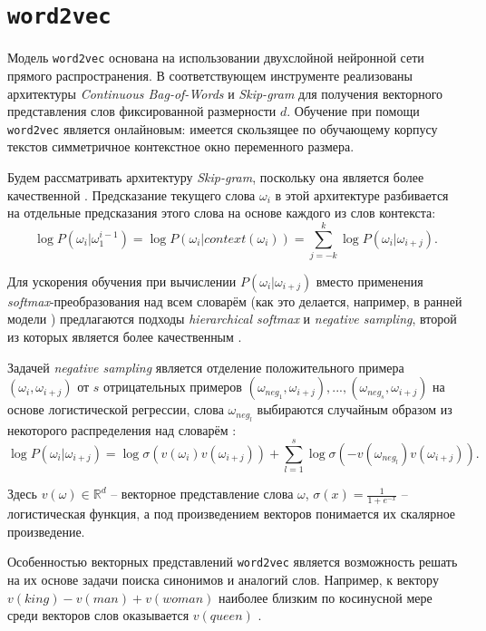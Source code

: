 \section{\texttt{word2vec}}
\label{sec:Chapter2} 

Модель \texttt{word2vec} основана на использовании двухслойной нейронной сети прямого распространения. В соответствующем инструменте реализованы архитектуры \textit{Continuous Bag-of-Words} и \textit{Skip-gram} \cite{mikolov1} для получения векторного представления слов фиксированной размерности \(d\). Обучение при помощи \texttt{word2vec} является онлайновым: имеется скользящее по обучающему корпусу текстов симметричное контекстное окно переменного размера.

Будем рассматривать архитектуру \textit{Skip-gram}, поскольку она является более качественной \cite{mikolov1}. Предсказание текущего слова \(\omega_i\) в этой архитектуре разбивается на отдельные предсказания этого слова на основе каждого из слов контекста: \[\log P(\omega_i|\omega_1^{i-1}) = \log P(\omega_i|context(\omega_i)) = \sum_{j=-k}^k \log P(\omega_i|\omega_{i+j}).\]

Для ускорения обучения при вычислении \(P(\omega_i|\omega_{i+j})\) вместо применения \textit{softmax}-преобразования над всем словарём (как это делается, например, в ранней модели \cite{bengio}) предлагаются подходы \textit{hierarchical softmax} и \textit{negative sampling}, второй из которых является более качественным \cite{mikolov2}.

Задачей \textit{negative sampling} является отделение положительного примера \((\omega_i, \omega_{i+j})\) от \(s\) отрицательных примеров \((\omega_{neg_1}, \omega_{i+j}), ..., (\omega_{neg_s}, \omega_{i+j})\) на основе логистической регрессии, слова \(\omega_{neg_l}\) выбираются случайным образом из некоторого распределения над словарём \cite{negative}: \[\log P(\omega_i|\omega_{i+j}) = \log \sigma (v(\omega_i) v(\omega_{i+j})) + \sum_{l=1}^s \log \sigma (- v(\omega_{neg_l}) v(\omega_{i+j})).\]

Здесь \(v(\omega) \in \mathbb{R}^d\) -- векторное представление слова \(\omega\), \(\sigma(x) = \frac{1}{1+e^{-x}}\) -- логистическая функция, а под произведением векторов понимается их скалярное произведение.

Особенностью векторных представлений \texttt{word2vec} является возможность решать на их основе задачи поиска синонимов и аналогий слов. Например, к вектору \(v(king)-v(man)+v(woman)\) наиболее близким по косинусной мере среди векторов слов оказывается \(v(queen)\) \cite{mikolov3}.